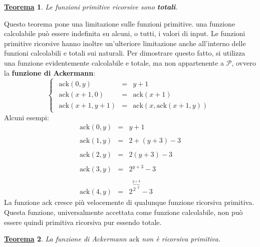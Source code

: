 \documentclass[a4paper]{article}
\newtheorem{theorem}{\textcolor{Red3}{\underline{Teorema}}}
\begin{document}
	\begin{theorem}
		Le funzioni primitive ricorsive sono \textbf{totali}.
	\end{theorem}
	\noindent
	Questo teorema pone una limitazione sulle funzioni primitive. una funzione calcolabile può essere indefinita su alcuni, o tutti, i valori di input. Le funzioni primitive ricorsive hanno inoltre un'ulteriore limitazione anche all'interno delle funzioni calcolabili e totali sui naturali. Per dimostrare questo fatto, si utilizza una funzione evidentemente calcolabile e totale, ma non appartenente a $\mathcal{P}$, ovvero la \textbf{funzione di Ackermann}:
	\begin{equation*}
		\begin{cases}
			\begin{array}{lll}
				\mathrm{ack}\left(0, y\right) 	& = & y+1 \\
				\mathrm{ack}\left(x+1, 0\right) & = & \mathrm{ack}\left(x+1\right) \\
				\mathrm{ack}\left(x+1, y+1\right) & = & \mathrm{ack}\left(x, \mathrm{ack}\left(x+1, y\right)\right)
			\end{array}
		\end{cases}
	\end{equation*}
	Alcuni esempi:
	\begin{equation*}
		\begin{array}{lll}
			\mathrm{ack}\left(0,y\right) & = & y+1 \\
			&& \\
			\mathrm{ack}\left(1,y\right) & = & 2+\left(y+3\right)-3 \\
			&& \\
			\mathrm{ack}\left(2,y\right) & = & 2\left(y+3\right)-3 \\
			&& \\
			\mathrm{ack}\left(3,y\right) & = & 2^{y+3} - 3 \\
			&& \\
			\mathrm{ack}\left(4,y\right) & = & 2^{\overbrace{{2^{.. 2}}}^{y+3}} - 3
		\end{array}
	\end{equation*}
	La funzione ack cresce più velocemente di qualunque funzione ricorsiva primitiva. Questa funzione, universalmente accettata come funzione calcolabile, non può essere quindi primitiva ricorsiva pur essendo totale.
	\begin{theorem}
		La funzione di Ackermann $\mathrm{ack}$ non è ricorsiva primitiva.
	\end{theorem}\newpage
	
\end{document}
